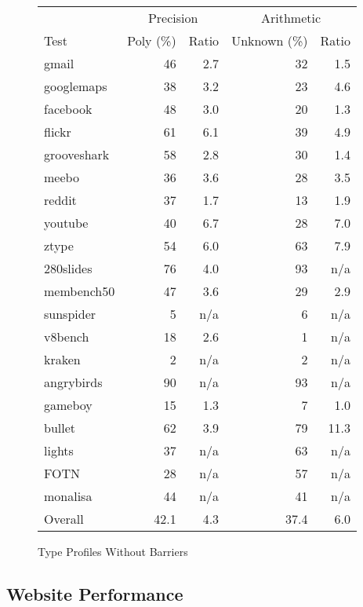\begin{figure}
\begin{center}
\begin{tabular}{lrrrr}
\toprule
     & \multicolumn{2}{c}{Precision}
     & \multicolumn{2}{c}{Arithmetic} \\
\cmidrule(r){2-3}
\cmidrule{4-5}
Test & Poly (\%) & Ratio & Unknown (\%) & Ratio \\
\midrule
gmail          & 46 & 2.7 & 32 & 1.5 \\
googlemaps     & 38 & 3.2 & 23 & 4.6 \\
facebook       & 48 & 3.0 & 20 & 1.3 \\
flickr         & 61 & 6.1 & 39 & 4.9 \\
grooveshark    & 58 & 2.8 & 30 & 1.4 \\
meebo          & 36 & 3.6 & 28 & 3.5 \\
reddit         & 37 & 1.7 & 13 & 1.9 \\
youtube        & 40 & 6.7 & 28 & 7.0 \\
ztype          & 54 & 6.0 & 63 & 7.9 \\
280slides      & 76 & 4.0 & 93 & n/a \\
membench50     & 47 & 3.6 & 29 & 2.9 \\
\midrule
sunspider      & 5 & n/a & 6 & n/a \\
v8bench        & 18 & 2.6 & 1 & n/a \\
kraken         & 2 & n/a & 2 & n/a \\
\midrule
angrybirds     & 90 & n/a & 93 & n/a \\
gameboy        & 15 & 1.3 & 7 & 1.0 \\
bullet         & 62 & 3.9 & 79 & 11.3 \\
lights         & 37 & n/a & 63 & n/a \\
FOTN           & 28 & n/a & 57 & n/a \\
monalisa       & 44 & n/a & 41 & n/a \\
\midrule
Overall        & 42.1 & 4.3 & 37.4 & 6.0 \\
\bottomrule
\end{tabular}
\end{center}
\nocaptionrule \caption{Type Profiles Without Barriers}
\label{fig:without_barriers}
\end{figure}

\subsection{Website Performance}
\label{sec:websites}

